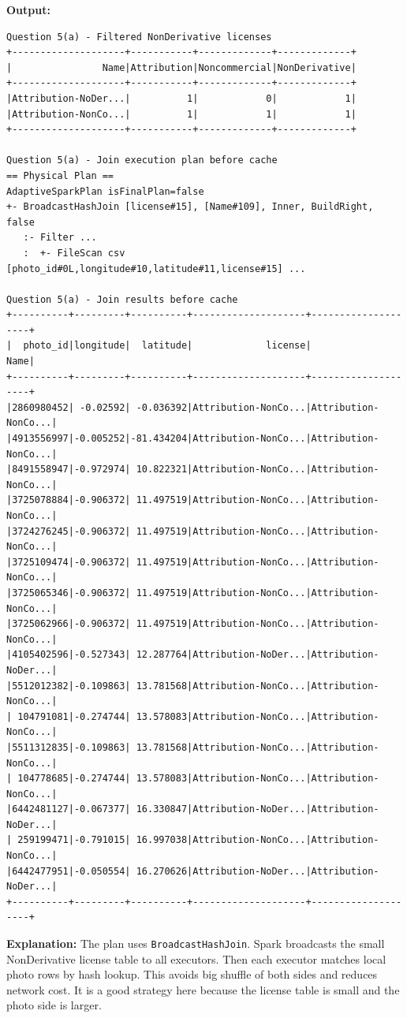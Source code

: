 \documentclass[11pt]{article}
\begin{document}
\textbf{Output:}
\begin{lstlisting}
Question 5(a) - Filtered NonDerivative licenses
+--------------------+-----------+-------------+-------------+
|                Name|Attribution|Noncommercial|NonDerivative|
+--------------------+-----------+-------------+-------------+
|Attribution-NoDer...|          1|            0|            1|
|Attribution-NonCo...|          1|            1|            1|
+--------------------+-----------+-------------+-------------+

Question 5(a) - Join execution plan before cache
== Physical Plan ==
AdaptiveSparkPlan isFinalPlan=false
+- BroadcastHashJoin [license#15], [Name#109], Inner, BuildRight, false
   :- Filter ...
   :  +- FileScan csv [photo_id#0L,longitude#10,latitude#11,license#15] ...

Question 5(a) - Join results before cache
+----------+---------+----------+--------------------+--------------------+
|  photo_id|longitude|  latitude|             license|                Name|
+----------+---------+----------+--------------------+--------------------+
|2860980452| -0.02592| -0.036392|Attribution-NonCo...|Attribution-NonCo...|
|4913556997|-0.005252|-81.434204|Attribution-NonCo...|Attribution-NonCo...|
|8491558947|-0.972974| 10.822321|Attribution-NonCo...|Attribution-NonCo...|
|3725078884|-0.906372| 11.497519|Attribution-NonCo...|Attribution-NonCo...|
|3724276245|-0.906372| 11.497519|Attribution-NonCo...|Attribution-NonCo...|
|3725109474|-0.906372| 11.497519|Attribution-NonCo...|Attribution-NonCo...|
|3725065346|-0.906372| 11.497519|Attribution-NonCo...|Attribution-NonCo...|
|3725062966|-0.906372| 11.497519|Attribution-NonCo...|Attribution-NonCo...|
|4105402596|-0.527343| 12.287764|Attribution-NoDer...|Attribution-NoDer...|
|5512012382|-0.109863| 13.781568|Attribution-NonCo...|Attribution-NonCo...|
| 104791081|-0.274744| 13.578083|Attribution-NonCo...|Attribution-NonCo...|
|5511312835|-0.109863| 13.781568|Attribution-NonCo...|Attribution-NonCo...|
| 104778685|-0.274744| 13.578083|Attribution-NonCo...|Attribution-NonCo...|
|6442481127|-0.067377| 16.330847|Attribution-NoDer...|Attribution-NoDer...|
| 259199471|-0.791015| 16.997038|Attribution-NonCo...|Attribution-NonCo...|
|6442477951|-0.050554| 16.270626|Attribution-NoDer...|Attribution-NoDer...|
+----------+---------+----------+--------------------+--------------------+
\end{lstlisting}

\textbf{Explanation:} The plan uses \texttt{BroadcastHashJoin}. Spark broadcasts the small NonDerivative license table to all executors. Then each executor matches local photo rows by hash lookup. This avoids big shuffle of both sides and reduces network cost. It is a good strategy here because the license table is small and the photo side is larger.
\end{document}
